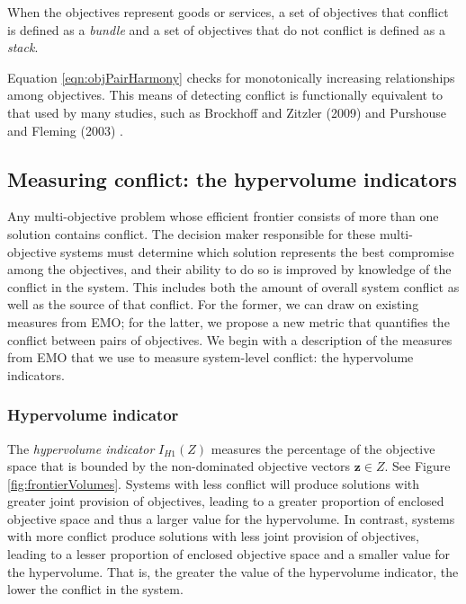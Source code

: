 When the objectives represent goods or services, a set of objectives that conflict is defined as a \textit{bundle} and a set of objectives that do not conflict is defined as a \textit{stack}.

Equation \eqref{eqn:objPairHarmony} checks for monotonically increasing relationships among objectives. This means of detecting conflict is functionally equivalent to that used by many studies, such as Brockhoff and Zitzler (2009) \cite{brockhoff2009objective} and Purshouse and Fleming (2003) \cite{purshouse2003conflict}.

\subsection{Measuring conflict: the hypervolume indicators}
\label{sec:waysToMeasureFrontiers}
Any multi-objective problem whose efficient frontier consists of more than one solution contains conflict. The decision maker responsible for these multi-objective systems must determine which solution represents the best compromise among the objectives, and their ability to do so is improved by knowledge of the conflict in the system. This includes both the amount of overall system conflict as well as the source of that conflict. For the former, we can draw on existing measures from EMO; for the latter, we propose a new metric that quantifies the conflict between pairs of objectives. We begin with a description of the measures from EMO that we use to measure system-level conflict: the hypervolume indicators.

\subsubsection{Hypervolume indicator}
The \textit{hypervolume indicator} $I_{H1}(Z)$ measures the percentage of the objective space that is bounded by the non-dominated objective vectors $\mathbf{z} \in Z$. See Figure \ref{fig:frontierVolumes}. Systems with less conflict will produce solutions with greater joint provision of objectives, leading to a greater proportion of enclosed objective space and thus a larger value for the hypervolume. In contrast, systems with more conflict produce solutions with less joint provision of objectives, leading to a lesser proportion of enclosed objective space and a smaller value for the hypervolume. That is, the greater the value of the hypervolume indicator, the lower the conflict in the system.

